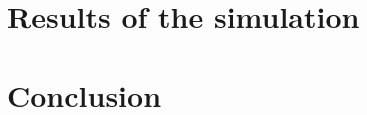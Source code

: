 \documentclass[10pt,a4paper,DIV=11]{scrreprt}
\begin{document}

\chapter{Results of the simulation}

\chapter{Conclusion}





\newpage


\listoffigures
\listoftables
\listofalgorithms
\lstlistoflistings

\newpage




\end{document}
